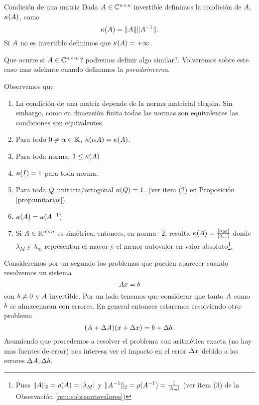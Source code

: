 \begin{defi}{Condición de una matriz}
Dada $\Ab\in \Cnn$ invertible definimos la condición de $\Ab$, $\kappa(\Ab)$, como
$$
\kappa(\Ab)=\|\Ab\|\|\Ab^{-1}\|.
$$
Si $\Ab$ no es invertible definimos que $\kappa(\Ab)=+\infty$.

\end{defi}
Que ocurre si $\Ab\in \C^{n\times m}$? podremos definir algo similar?.  Volveremos sobre este caso mas adelante cuando definamos la \emph{pseudoinversa}.
\begin{remark}
\label{rem:deCondicion}
Observemos que
\begin{enumerate}
 \item La condición de una matriz depende de la norma matricial elegida. Sin embargo, como en dimensión finita todas las normas son equivalentes las condiciones son equivalentes.
\item Para todo $\cero\neq \alpha\in \K$, $\kappa(\alpha\Ab)=\kappa(\Ab)$.
 \item Para toda norma, $1\le \kappa(\Ab)$
\item $\kappa(\Ib)=1$ para toda norma.
\item Para toda $\Qb$ unitaria/ortogonal
$\kappa(\Qb)=1$. (ver item (2) en Proposición \ref{prop:unitarias})
\item $\kappa(\Ab)=\kappa(\Ab^{-1})$
\item Si $\Ab\in \Rnn$ es simétrica, entonces, en norma$-2$, resulta $\kappa(\Ab)=\frac{|\lambda_M|}{|\lambda_m|}$ donde $\lambda_M$ y $\lambda_m$ representan el mayor y el menor autovalor en valor absoluto\footnote{Pues $\|\Ab\|_2=\rho(\Ab)=|\lambda_M|$ y $\|\Ab^{-1}\|_2=\rho(\Ab^{-1})=\frac{1}{|\lambda_m|}$ (ver item (3) de la Observación \ref{rem:sobreautovalores})}.
\end{enumerate}
\end{remark}
Consideremos por un segundo los problemas que pueden aparecer cuando resolvemos un sistema
$$
\Ab\xb=\bb
$$
con $\bb\neq\cero$ y $\Ab$ invertible.
Por un lado tenemos que considerar que tanto $\Ab$ como $\bb$ se almacenaran con errores. En general entonces estaremos resolviendo otro problema
$$
(\Ab+\Delta\Ab)(\xb+\Delta \xb)=
\bb +\Delta \bb.
$$
Asumiendo que procedemos a resolver el problema con aritmética exacta (no hay mas fuentes de error) nos interesa ver el impacto en el error $\Delta \xb$ debido a los errores $\Delta \Ab,\Delta \bb$.

